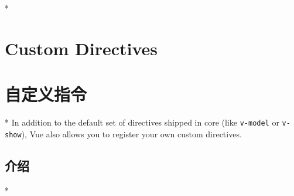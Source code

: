 \begin{paracol}{2}

\switchcolumn[0]*%
\section{Custom Directives}
\switchcolumn
\section{自定义指令}
\switchcolumn[0]*%
In addition to the default set of directives shipped in core (like
\texttt{v-model} or \texttt{v-show}), Vue also allows you to register
your own custom directives.
\switchcolumn
\subsection{介绍}
\switchcolumn[0]*%

\end{paracol}
